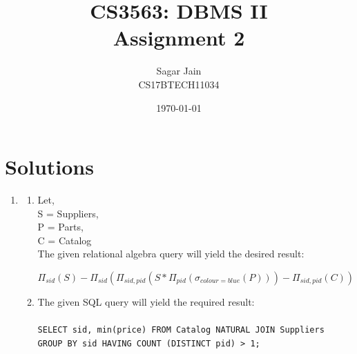 \documentclass[12pt]{article}
\begin{document}
\title{CS3563: DBMS II\\Assignment 2}
\author{Sagar Jain\\CS17BTECH11034}
\date{\AdvanceDate[-1]\today}
\maketitle
\section{Solutions}
\begin{enumerate}
\item \begin{enumerate}
\item Let,\\
S = Suppliers,\\
P = Parts,\\
C = Catalog\\

The given relational algebra query will yield the desired result:
\begin{center}
$ \Pi_{sid}(S) - \Pi_{sid}(\Pi_{sid, pid}(S * \Pi_{pid}(\sigma_{colour=blue}(P))) - \Pi_{sid, pid}(C)) $
\end{center}
\item The given SQL query will yield the required result:\\\\
\texttt{SELECT sid, min(price) FROM Catalog NATURAL JOIN Suppliers GROUP BY sid HAVING COUNT (DISTINCT pid) > 1;}\\


\end{enumerate}
\end{enumerate}
\end{document}
